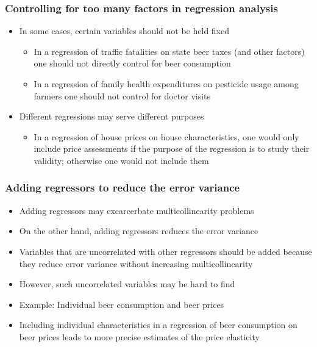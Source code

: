 \documentclass[aspectratio=169]{beamer}
\begin{document}
\begin{frame}
    \frametitle{Controlling for too many factors in regression analysis}
    \begin{itemize}
        \item In some cases, certain variables should not be held fixed
	\begin{itemize}
        \item In a regression of traffic fatalities on state beer taxes (and other factors) one should not directly control for beer consumption
	\item In a regression of family health expenditures on pesticide usage among farmers one should not control for doctor visits
	\end{itemize}  
\item Different regressions may serve different purposes

    \begin{itemize}
        \item In a regression of house prices on house characteristics, one would only include price assessments if the purpose of the regression is to study their validity; otherwise one would not include them

\end{itemize}
\end{itemize}          
\end{frame}

\begin{frame}
    \frametitle{Adding regressors to reduce the error variance}
    \begin{itemize}
        \item Adding regressors may excarcerbate multicollinearity problems
\item On the other hand, adding regressors reduces the error variance 
\item Variables that are uncorrelated with other regressors should be added because they reduce error variance without increasing multicollinearity
\item However, such uncorrelated variables may be hard to find
\item Example: Individual beer consumption and beer prices
\item Including individual characteristics in a regression of beer consumption on beer prices leads to more precise estimates of the price elasticity

\end{itemize}          
\end{frame}
\end{document}
